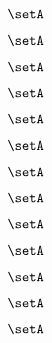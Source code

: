 \begin{forslides}
    \begin{equation}
        \label{eq:slides-processes-116}
        \setA
    \end{equation}

    \begin{equation}
        \label{eq:slides-processes-117}
        \setA
    \end{equation}

    \begin{equation}
        \label{eq:slides-processes-118}
        \setA
    \end{equation}

    \begin{equation}
        \label{eq:slides-processes-119}
        \setA
    \end{equation}

    \begin{equation}
        \label{eq:slides-processes-120}
        \setA
    \end{equation}

    \begin{equation}
        \label{eq:slides-processes-121}
        \setA
    \end{equation}

    \begin{equation}
        \label{eq:slides-processes-122}
        \setA
    \end{equation}

    \begin{equation}
        \label{eq:slides-processes-123}
        \setA
    \end{equation}

    \begin{equation}
        \label{eq:slides-processes-124}
        \setA
    \end{equation}

    \begin{equation}
        \label{eq:slides-processes-125}
        \setA
    \end{equation}

    \begin{equation}
        \label{eq:slides-processes-126}
        \setA
    \end{equation}

    \begin{equation}
        \label{eq:slides-processes-127}
        \setA
    \end{equation}

    \begin{equation}
        \label{eq:slides-processes-128}
        \setA
    \end{equation}


\end{forslides}
